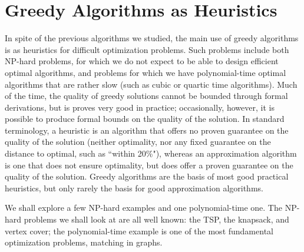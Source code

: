 \documentclass[11pt]{article}
\begin{document}
\section{Greedy Algorithms as Heuristics}
In spite of the previous algorithms we studied, the main use of greedy
algorithms is as heuristics for difficult optimization problems.
Such problems include both NP-hard problems, for which we do not expect
to be able to design efficient optimal algorithms, and problems for which
we have polynomial-time optimal algorithms that are rather slow (such as cubic
or quartic time algorithms).  Much of the time, the quality of greedy solutions
cannot be bounded through formal derivations, but is proves very good in
practice; occasionally, however, it is possible to produce formal bounds on
the quality of the solution.  In standard terminology, a heuristic is an
algorithm that offers no proven guarantee on the quality of the solution
(neither optimality, nor any fixed guarantee on the distance to optimal, such
as ``within 20\%"), whereas an approximation algorithm is one that does not
ensure optimality, but does offer a proven guarantee on the quality of the
solution.  Greedy algorithms are the basis of most good practical heuristics,
but only rarely the basis for good approximation algorithms.

We shall explore a few NP-hard examples and one polynomial-time one.
The NP-hard problems we shall look at are all well known: the TSP,
the knapsack, and vertex cover; the polynomial-time example is one
of the most fundamental optimization problems, matching in graphs.
\end{document}
